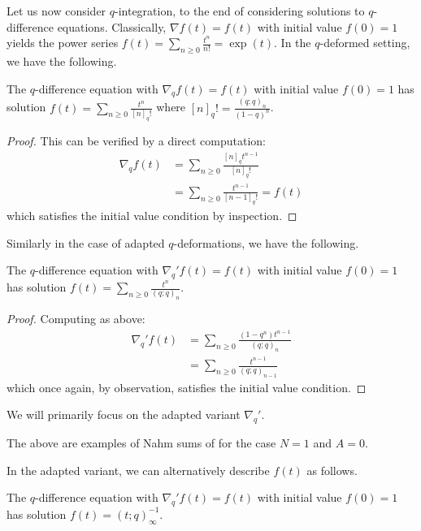 Let us now consider $q$-integration, to the end of considering solutions to $q$-difference equations. Classically, $\nabla f(t)=f(t)$ with initial value $f(0)=1$ yields the power series $f(t)=\sum_{n\geq0}\frac{t^{n}}{n!}=\exp(t)$. In the $q$-deformed setting, we have the following. 
\begin{proposition}\label{prop: q-deformed exponential}
    The $q$-difference equation with $\nabla_{q}f(t)=f(t)$ with initial value $f(0)=1$ has solution $f(t)=\sum_{n\geq0}\frac{t^{n}}{[n]_{q}!}$ where $[n]_{q}!=\frac{(q;q)_{n}}{(1-q)^{n}}$.
\end{proposition}
\begin{proof}
    This can be verified by a direct computation:
    \begin{align*}
        \nabla_{q}f(t) &= \sum_{n\geq0}\frac{[n]_{q}t^{n-1}}{[n]_{q}!} \\
        &=\sum_{n\geq0}\frac{t^{n-1}}{[n-1]_{q}!} = f(t)
    \end{align*}
    which satisfies the initial value condition by inspection. 
\end{proof}
Similarly in the case of adapted $q$-deformations, we have the following. 
\begin{proposition}\label{prop: adapted q-deformed exponential}
    The $q$-difference equation with $\nabla_{q}'f(t)=f(t)$ with initial value $f(0)=1$ has solution $f(t)=\sum_{n\geq0}\frac{t^{n}}{(q;q)_{n}}$. 
\end{proposition}
\begin{proof}
    Computing as above:
    \begin{align*}
        \nabla_{q}'f(t) &= \sum_{n\geq0}\frac{(1-q^{n})t^{n-1}}{(q;q)_{n}} \\
        &=\sum_{n\geq0}\frac{t^{n-1}}{(q;q)_{n-1}}
    \end{align*}
    which once again, by observation, satisfies the initial value condition. 
\end{proof}
\begin{remark}
    We will primarily focus on the adapted variant $\nabla_{q}'$. 
\end{remark}
\begin{remark}
    The above are examples of Nahm sums of  for the case $N=1$ and $A=0$. 
\end{remark}
In the adapted variant, we can alternatively describe $f(t)$ as follows. 
\begin{proposition}\label{prop: Pochhammer as exponential}
    The $q$-difference equation with $\nabla_{q}'f(t)=f(t)$ with initial value $f(0)=1$ has solution $f(t)=(t;q)_{\infty}^{-1}$.
\end{proposition}
